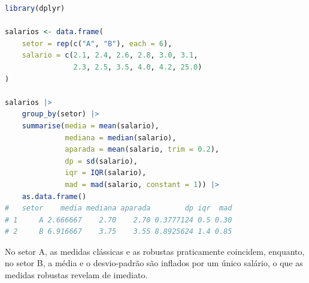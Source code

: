 \begin{lstlisting}[language=R, caption={Medidas de Resumo por Grupos}, label={cod:resumo grupos}]
library(dplyr)

salarios <- data.frame(
    setor = rep(c("A", "B"), each = 6),
    salario = c(2.1, 2.4, 2.6, 2.8, 3.0, 3.1,
                2.3, 2.5, 3.5, 4.0, 4.2, 25.0)
)

salarios |>
    group_by(setor) |>
    summarise(media = mean(salario),
              mediana = median(salario),
              aparada = mean(salario, trim = 0.2),
              dp = sd(salario),
              iqr = IQR(salario),
              mad = mad(salario, constant = 1)) |>
    as.data.frame()
#   setor    media mediana aparada        dp iqr  mad
# 1     A 2.666667    2.70    2.70 0.3777124 0.5 0.30
# 2     B 6.916667    3.75    3.55 8.8925624 1.4 0.85
\end{lstlisting}

No setor A, as medidas clássicas e as robustas praticamente coincidem, enquanto, no setor
B, a média e o desvio-padrão são inflados por um único salário, o que as medidas robustas
revelam de imediato.
